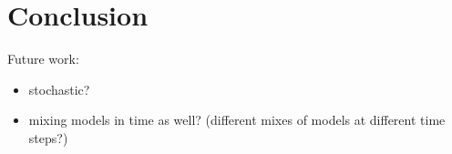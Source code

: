 \section{Conclusion}\label{sect:conc}
Future work:
\begin{itemize}
\item stochastic?
\item mixing models in time as well? (different mixes of models at different time steps?)
\end{itemize}
